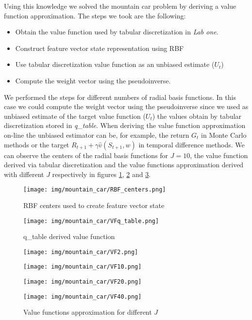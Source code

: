 \documentclass[runningheads]{llncs}
\begin{document}
Using this knowledge we solved the mountain car problem by
deriving a value function approximation. The steps we took are the
following:
\begin{itemize}
  \item Obtain the value function used by tabular discretization in
    \textit{Lab one}.
  \item Construct feature vector state representation using RBF
    \item Use tabular discretization value function as an unbiased
      estimate ($U_t$)
    \item Compute the weight vector using the pseudoinverse.
\end{itemize}
We performed the steps for different numbers of radial basis
functions. In this case we could compute the weight vector using the
pseudoinverse since we used as unbiased estimate of the target value
function ($U_t$) the values obtain by tabular discretization
stored in \textit{q\_table}. When deriving the value function
approximation on-line the unbiased estimator can be, for
example, the return $G_t$ in Monte Carlo methods or the target
$R_{t+1} +\gamma \hat{v}(S_{t+1}, w)$ in temporal difference
methods. We can observe the centers of the radial basis functions for
$J = 10$, the value function derived via tabular discretization and
the value functions approximation derived with different $J$
respectively in figures \ref{fig4}, \ref{fig5} and \ref{fig6}.
\begin{figure}[!htb]
    \centering
\texttt{[image: img/mountain\_car/RBF\_centers.png]}
\caption{RBF centers used to create feature vector state}\label{fig4}
\end{figure}
\begin{figure}[!htb]
    \centering
\texttt{[image: img/mountain\_car/VFq\_table.png]}
\caption{q\_table derived value function}\label{fig5}
\end{figure}
\begin{figure}[!htb]
  \centering
  \begin{minipage}[b]{0.45\textwidth}
    \texttt{[image: img/mountain\_car/VF2.png]}
  \end{minipage}
  \hfill
  \begin{minipage}[b]{0.45\textwidth}
    \texttt{[image: img/mountain\_car/VF10.png]}
  \end{minipage}
    \hfill
  \begin{minipage}[b]{0.45\textwidth}
    \texttt{[image: img/mountain\_car/VF20.png]}
  \end{minipage}
    \hfill
  \begin{minipage}[b]{0.45\textwidth}
    \texttt{[image: img/mountain\_car/VF40.png]}
  \end{minipage}
 \caption{Value functions approximation for different $J$}\label{fig6}
\end{figure}
\end{document}
